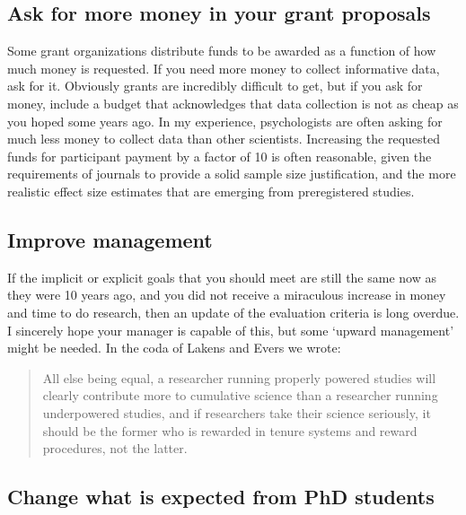 \documentclass[
]{krantz}
\begin{document}
\hypertarget{ask-for-more-money-in-your-grant-proposals}{%
\subsection{Ask for more money in your grant proposals}\label{ask-for-more-money-in-your-grant-proposals}}

Some grant organizations distribute funds to be awarded as a function of how much money is requested. If you need more money to collect informative data, ask for it. Obviously grants are incredibly difficult to get, but if you ask for money, include a budget that acknowledges that data collection is not as cheap as you hoped some years ago. In my experience, psychologists are often asking for much less money to collect data than other scientists. Increasing the requested funds for participant payment by a factor of 10 is often reasonable, given the requirements of journals to provide a solid sample size justification, and the more realistic effect size estimates that are emerging from preregistered studies.

\hypertarget{improve-management}{%
\subsection{Improve management}\label{improve-management}}

If the implicit or explicit goals that you should meet are still the same now as they were 10 years ago, and you did not receive a miraculous increase in money and time to do research, then an update of the evaluation criteria is long overdue. I sincerely hope your manager is capable of this, but some `upward management' might be needed. In the coda of Lakens and Evers \citeyearpar{lakens_sailing_2014} we wrote:

\begin{quote}
All else being equal, a researcher running properly powered studies will clearly contribute more to cumulative science than a researcher running underpowered studies, and if researchers take their science seriously, it should be the former who is rewarded in tenure systems and reward procedures, not the latter.
\end{quote}

\hypertarget{change-what-is-expected-from-phd-students}{%
\subsection{Change what is expected from PhD students}\label{change-what-is-expected-from-phd-students}}
\end{document}
